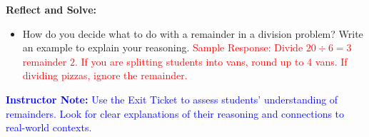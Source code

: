\documentclass[12pt]{article}
\begin{document}
\begin{tcolorbox}[colframe=black!60, colback=white, 
coltitle=black, colbacktitle=black!15, fonttitle=\bfseries\Large, 
title=Exit Ticket, halign title=center, left=10pt, right=10pt, top=10pt, bottom=15pt]
\textbf{Reflect and Solve:}
\begin{itemize}
    \item How do you decide what to do with a remainder in a division problem? Write an example to explain your reasoning.
    \textcolor{red}{Sample Response: Divide \( 20 \div 6 = 3 \) remainder \( 2 \). If you are splitting students into vans, round up to 4 vans. If dividing pizzas, ignore the remainder.}
\end{itemize}

\textcolor{blue}{\textbf{Instructor Note:} Use the Exit Ticket to assess students' understanding of remainders. Look for clear explanations of their reasoning and connections to real-world contexts.}
\end{tcolorbox}
\end{document}

